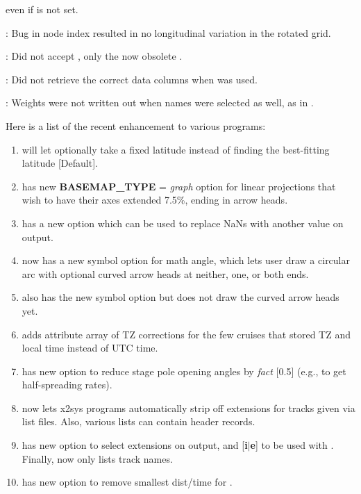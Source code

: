 \begin{description}
		even if  is not set.
	\item [\GMTprog{spotter/grdrotater.c}]:	Bug in node index resulted in no longitudinal variation in the rotated grid.
	\item [\GMTprog{x2sys/x2sys\_init.c}]:	Did not accept , only the now obsolete .
	\item [\GMTprog{x2sys/x2sys\_datalist.c}]:	Did not retrieve the correct data columns when  was used.
	\item [\GMTprog{x2sys/x2sys\_list.c}]:	Weights were not written out when names were selected as well, as in .
\end{description}

Here is a list of the recent enhancement to various programs:

\begin{enumerate}
	\item {} will let  optionally take a fixed latitude instead of finding
		the best-fitting latitude [Default].
	\item {} has new {\bf BASEMAP\_TYPE} = {\it graph} option for linear projections that wish to
		have their axes extended 7.5\%, ending in arrow heads.
	\item {} has a new option  which can be used to replace NaNs with another value on output.
	\item {} now has a new symbol  option for math angle, which lets
		user draw a circular arc with optional curved arrow heads at neither, one, or both ends.
	\item {} also has the new symbol  option but does not draw the curved arrow heads yet.
	\item {} adds attribute array of TZ corrections for the few cruises
		that stored TZ and local time instead of UTC time.
	\item {} has new option  to reduce stage pole opening
		angles by {\it fact} [0.5] (e.g., to get half-spreading rates).
	\item {} now lets x2sys programs automatically strip off extensions for tracks given via list files.
		Also, various lists can contain header records.
	\item {} has new option  to select extensions on output, and [{\bf i$|$e}] to be used with .
	Finally,  now only lists track names.
	\item {} has new option  to remove smallest dist/time for .
\end{enumerate}

